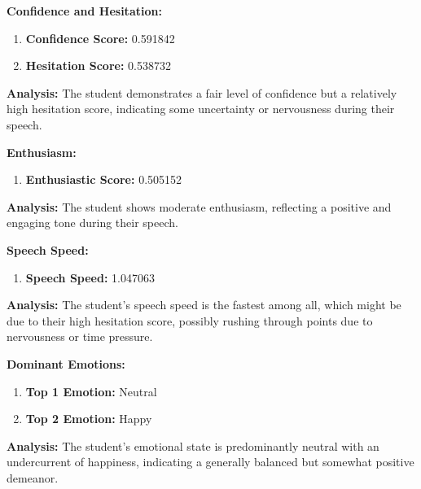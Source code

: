 \documentclass{article}
\begin{document}
\large{\textbf{Confidence and Hesitation:}}
\begin{tcolorbox}[colback=green!10!white, colframe=green!80!black, title=Confidence and Hesitation Scores]
    \begin{enumerate}
        \item \textbf{Confidence Score:} \textcolor{green!50!black}{0.591842}
        \item \textbf{Hesitation Score:} \textcolor{red!70!black}{0.538732}
    \end{enumerate}
\end{tcolorbox}
    \textbf{Analysis:} The student demonstrates a fair level of confidence but a relatively high hesitation score, indicating some uncertainty or nervousness during their speech.

\large{\textbf{Enthusiasm:}}
\begin{tcolorbox}[colback=orange!10!white, colframe=orange!80!black, title=Enthusiastic Score]
    \begin{enumerate}
        \item \textbf{Enthusiastic Score:} \textcolor{orange!70!black}{0.505152}
    \end{enumerate}
\end{tcolorbox}
    \textbf{Analysis:} The student shows moderate enthusiasm, reflecting a positive and engaging tone during their speech.

\large{\textbf{Speech Speed:}}
\begin{tcolorbox}[colback=purple!10!white, colframe=purple!80!black, title=Speech Speed]
    \begin{enumerate}
        \item \textbf{Speech Speed:} \textcolor{purple!70!black}{1.047063}
    \end{enumerate}
\end{tcolorbox}
    \textbf{Analysis:} The student's speech speed is the fastest among all, which might be due to their high hesitation score, possibly rushing through points due to nervousness or time pressure.

\large{\textbf{Dominant Emotions:}}
\begin{tcolorbox}[colback=pink!10!white, colframe=pink!80!black, title=Emotional State]
    \begin{enumerate}
        \item \textbf{Top 1 Emotion:} \textcolor{blue!80!black}{Neutral}
        \item \textbf{Top 2 Emotion:} \textcolor{red!80!black}{Happy}
    \end{enumerate}
\end{tcolorbox}
    \textbf{Analysis:} The student’s emotional state is predominantly neutral with an undercurrent of happiness, indicating a generally balanced but somewhat positive demeanor.
\end{document}

